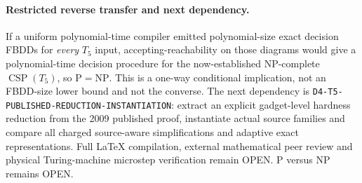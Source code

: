 \documentclass[11pt]{article}
\begin{document}
\paragraph{Restricted reverse transfer and next dependency.}
If a uniform polynomial-time compiler emitted
polynomial-size exact decision FBDDs for \emph{every}
$T_5$ input, accepting-reachability on those diagrams
would give a polynomial-time decision procedure for
the now-established NP-complete $\operatorname{CSP}(T_5)$,
so $\mathrm P=\mathrm{NP}$. This is a one-way conditional
implication, not an FBDD-size lower bound and not the
converse. The next dependency is
\texttt{D4-T5-PUBLISHED-REDUCTION-INSTANTIATION}:
extract an explicit gadget-level hardness reduction
from the 2009 published proof, instantiate actual
source families and compare all charged source-aware
simplifications and adaptive exact representations.
Full \LaTeX{} compilation, external mathematical peer
review and physical Turing-machine microstep
verification remain OPEN. P versus NP remains OPEN.
\end{document}
